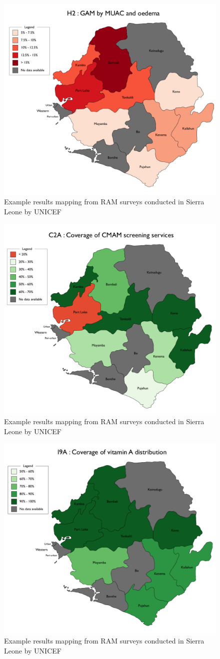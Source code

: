 \documentclass[12pt,a4paper]{article}
\begin{document}
\begin{figure}

{\centering \includegraphics[width=0.6\linewidth]{figures/h2} 

}

\caption{Example results mapping from RAM surveys conducted in Sierra Leone by UNICEF}\label{fig:sampleResults11}
\end{figure}
\begin{figure}

{\centering \includegraphics[width=0.6\linewidth]{figures/c2a} 

}

\caption{Example results mapping from RAM surveys conducted in Sierra Leone by UNICEF}\label{fig:sampleResults12}
\end{figure}
\begin{figure}

{\centering \includegraphics[width=0.6\linewidth]{figures/i9a} 

}

\caption{Example results mapping from RAM surveys conducted in Sierra Leone by UNICEF}\label{fig:sampleResults13}
\end{figure}
\end{document}
